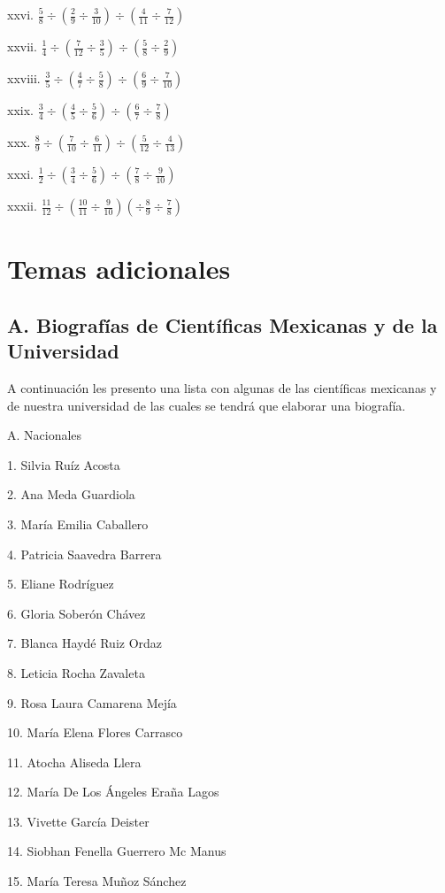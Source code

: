 \documentclass[]{book}
\begin{document}
\begin{multicols}{2}
    xxvi. $\frac{5}{8} \div (\frac{2}{9} \div \frac{3}{10}) \div (\frac{4}{11} \div \frac{7}{12})$
 
    xxvii. $\frac{1}{4} \div (\frac{7}{12} \div \frac{3}{5}) \div (\frac{5}{8} \div \frac{2}{9})$
 
    xxviii. $\frac{3}{5} \div (\frac{4}{7} \div \frac{5}{8}) \div (\frac{6}{9} \div \frac{7}{10})$
 
    xxix. $\frac{3}{4} \div (\frac{4}{5} \div \frac{5}{6}) \div (\frac{6}{7} \div \frac{7}{8})$
 
    xxx. $\frac{8}{9} \div (\frac{7}{10} \div \frac{6}{11}) \div (\frac{5}{12} \div \frac{4}{13})$
 
    xxxi. $\frac{1}{2} \div (\frac{3}{4} \div \frac{5}{6}) \div (\frac{7}{8} \div \frac{9}{10})$
 
    xxxii. $\frac{11}{12} \div (\frac{10}{11} \div \frac{9}{10}) (\div \frac{8}{9} \div \frac{7}{8})$
\end{multicols}

\chapter{Temas adicionales}\label{temas-adicionales}

\section{A. Biografías de Científicas Mexicanas y de la
Universidad}\label{a.-biografuxedas-de-cientuxedficas-mexicanas-y-de-la-universidad}

A continuación les presento una lista con algunas de las científicas
mexicanas y de nuestra universidad de las cuales se tendrá que elaborar
una biografía.

A. Nacionales

\begin{multicols}{2} 

      1. Silvia Ruíz Acosta
  
      2. Ana Meda Guardiola
  
      3. María Emilia Caballero
  
      4. Patricia Saavedra Barrera
  
      5. Eliane Rodríguez
  
      6. Gloria Soberón Chávez
  
      7. Blanca Haydé Ruiz Ordaz
  
      8. Leticia Rocha Zavaleta
  
      9. Rosa Laura Camarena Mejía
  
      10. María Elena Flores Carrasco
  
      11. Atocha Aliseda Llera
  
      12. María De Los Ángeles Eraña Lagos
  
      13. Vivette García Deister
  
      14. Siobhan Fenella Guerrero Mc Manus
  
      15. María Teresa Muñoz Sánchez
\end{multicols}
\end{document}
